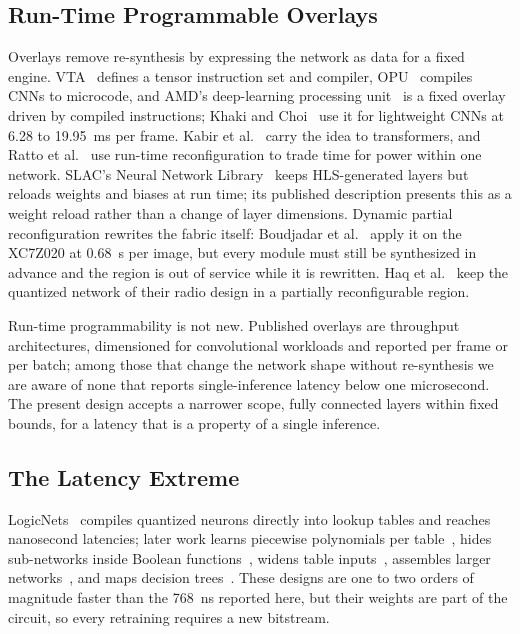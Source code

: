 \documentclass[pdflatex,sn-mathphys-num,iicol]{sn-jnl}
\begin{document}
\subsection{Run-Time Programmable Overlays}
\label{sec:overlays}
Overlays remove re-synthesis by expressing the network as data for a fixed
engine. VTA~\cite{Moreau2019} defines a tensor instruction set and compiler,
OPU~\cite{Yu2020,YuLight2020} compiles CNNs to microcode, and AMD's
deep-learning processing unit~\cite{AMDVitisAI} is a fixed overlay driven by
compiled instructions; Khaki and Choi~\cite{Khaki2025} use it for lightweight
CNNs at 6.28 to \SI{19.95}{\milli\second} per frame. Kabir et
al.~\cite{Kabir2026} carry the idea to transformers, and Ratto et
al.~\cite{Ratto2023} use run-time reconfiguration to trade time for power within
one network. SLAC's Neural Network Library~\cite{EzzaouiRahali2025} keeps
HLS-generated layers but reloads weights and biases at run time; its published
description presents this as a weight reload rather than a change of layer
dimensions. Dynamic partial reconfiguration rewrites the fabric itself:
Boudjadar et al.~\cite{Boudjadar2025} apply it on the XC7Z020 at
\SI{0.68}{\second} per image, but every module must still be synthesized in
advance and the region is out of service while it is rewritten. Haq et
al.~\cite{Haq2026} keep the quantized network of their radio design in a
partially reconfigurable region.

Run-time programmability is not new. Published overlays
are throughput architectures, dimensioned for convolutional workloads and
reported per frame or per batch; among those that change the network shape
without re-synthesis we are aware of none that reports single-inference latency
below one microsecond. The present design accepts a narrower scope, fully
connected layers within fixed bounds, for a latency that is a property of a
single inference.

\subsection{The Latency Extreme}
LogicNets~\cite{Umuroglu2020} compiles quantized neurons directly into
lookup tables and reaches nanosecond latencies; later work learns piecewise
polynomials per table~\cite{Andronic2023}, hides sub-networks inside Boolean
functions~\cite{Andronic2024}, widens table inputs~\cite{Lou2024}, assembles
larger networks~\cite{Andronic2025}, and maps decision trees~\cite{Khataei2025}.
These designs are one to two orders of magnitude faster than the
\SI{768}{\nano\second} reported here, but their weights are part of the circuit,
so every retraining requires a new bitstream.
\end{document}
